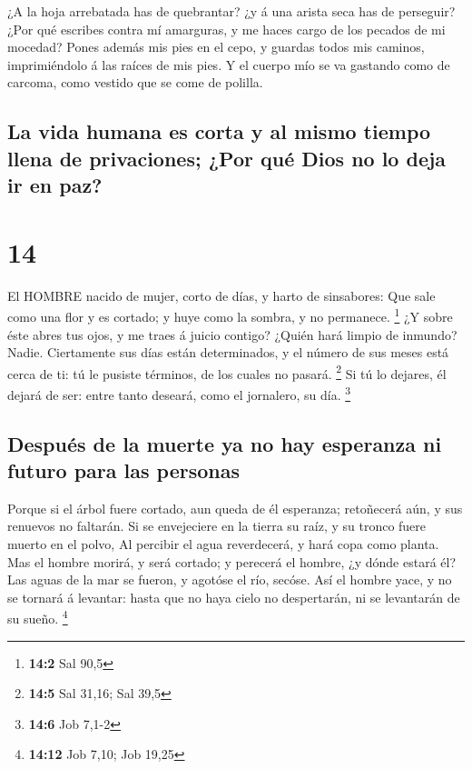 ¿A la hoja arrebatada has de quebrantar? ¿y á una arista
seca has de perseguir?  ¿Por qué escribes contra mí
amarguras, y me haces cargo de los pecados de mi mocedad? 
Pones además mis pies en el cepo, y guardas todos mis caminos,
imprimiéndolo á las raíces de mis pies.  Y el cuerpo mío se
va gastando como de carcoma, como vestido que se come de polilla.

\hypertarget{la-vida-humana-es-corta-y-al-mismo-tiempo-llena-de-privaciones-por-quuxe9-dios-no-lo-deja-ir-en-paz}{%
\subsection{La vida humana es corta y al mismo tiempo llena de
privaciones; ¿Por qué Dios no lo deja ir en
paz?}\label{la-vida-humana-es-corta-y-al-mismo-tiempo-llena-de-privaciones-por-quuxe9-dios-no-lo-deja-ir-en-paz}}

\hypertarget{section-13}{%
\section{14}\label{section-13}}

 El HOMBRE nacido de mujer, corto de días, y harto de
sinsabores:  Que sale como una flor y es cortado; y huye
como la sombra, y no permanece. \footnote{\textbf{14:2} Sal 90,5}
 ¿Y sobre éste abres tus ojos, y me traes á juicio contigo?
 ¿Quién hará limpio de inmundo? Nadie. 
Ciertamente sus días están determinados, y el número de sus meses está
cerca de ti: tú le pusiste términos, de los cuales no pasará.
\footnote{\textbf{14:5} Sal 31,16; Sal 39,5}  Si tú lo
dejares, él dejará de ser: entre tanto deseará, como el jornalero, su
día. \footnote{\textbf{14:6} Job 7,1-2}

\hypertarget{despuuxe9s-de-la-muerte-ya-no-hay-esperanza-ni-futuro-para-las-personas}{%
\subsection{Después de la muerte ya no hay esperanza ni futuro para las
personas}\label{despuuxe9s-de-la-muerte-ya-no-hay-esperanza-ni-futuro-para-las-personas}}

 Porque si el árbol fuere cortado, aun queda de él
esperanza; retoñecerá aún, y sus renuevos no faltarán.  Si
se envejeciere en la tierra su raíz, y su tronco fuere muerto en el
polvo,  Al percibir el agua reverdecerá, y hará copa como
planta.  Mas el hombre morirá, y será cortado; y perecerá
el hombre, ¿y dónde estará él?  Las aguas de la mar se
fueron, y agotóse el río, secóse.  Así el hombre yace, y no
se tornará á levantar: hasta que no haya cielo no despertarán, ni se
levantarán de su sueño. \footnote{\textbf{14:12} Job 7,10; Job 19,25}

